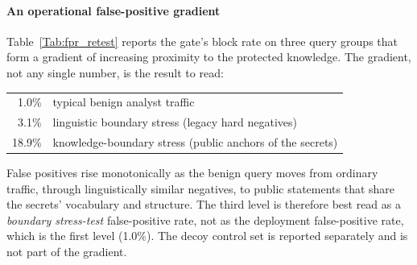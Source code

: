\documentclass[journal]{IEEEtran}
\begin{document}
\paragraph{An operational false-positive gradient}
Table~\ref{Tab:fpr_retest} reports the gate's block rate on three query groups
that form a gradient of increasing proximity to the protected knowledge. The
gradient, not any single number, is the result to read:
\begin{center}
\begin{tabular}{r l}
1.0\% & typical benign analyst traffic \\
3.1\% & linguistic boundary stress (legacy hard negatives) \\
18.9\% & knowledge-boundary stress (public anchors of the secrets) \\
\end{tabular}
\end{center}
False positives rise monotonically as the benign query moves from ordinary
traffic, through linguistically similar negatives, to public statements that
share the secrets' vocabulary and structure. The third level is therefore best
read as a \emph{boundary stress-test} false-positive rate, not as the
deployment false-positive rate, which is the first level (1.0\%). The decoy
control set is reported separately and is not part of the gradient.

\begin{table}[!t]
    \centering
    \caption{Gate-level false positives on corpus\_v2 as an operational gradient (deterministic; secret index = 90 bundles). Block rate rises monotonically with proximity to the protected knowledge. Decoys are reported separately and excluded from the gradient.}
    \label{Tab:fpr_retest}
\end{table}
\end{document}

